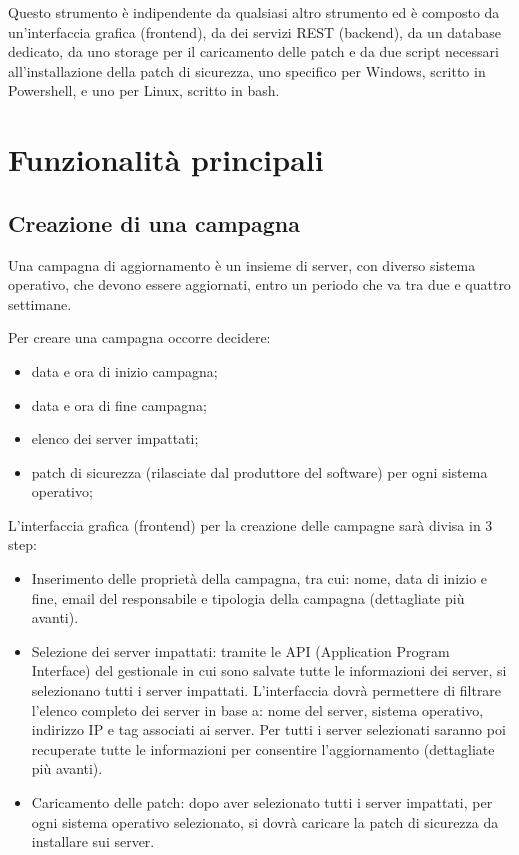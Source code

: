 Questo strumento è indipendente da qualsiasi altro strumento ed è composto
da un’interfaccia grafica (frontend), da dei servizi REST (backend), da
un database dedicato, da uno storage per il caricamento delle patch e da
due script necessari all’installazione della patch di sicurezza, uno 
specifico per Windows, scritto in Powershell, e uno per Linux, scritto 
in bash.


\section{Funzionalità principali}
\subsection{Creazione di una campagna}
Una campagna di aggiornamento è un insieme di server, con diverso sistema 
operativo, che devono essere aggiornati, entro un periodo che va tra due e 
quattro settimane. 

Per creare una campagna occorre decidere:
\begin{itemize}
\item data e ora di inizio campagna;
\item data e ora di fine campagna;
\item elenco dei server impattati;
\item patch di sicurezza (rilasciate dal produttore del software) per 
ogni sistema operativo;
\end{itemize}
L’interfaccia grafica (frontend) per la creazione delle campagne sarà 
divisa in 3 step:
\begin{itemize}
\item Inserimento delle proprietà della campagna, tra cui: nome, data di 
inizio e fine, email del responsabile e tipologia della campagna 
(dettagliate più avanti).
\item Selezione dei server impattati: tramite le API (Application Program 
Interface) del gestionale in cui sono salvate tutte le informazioni dei 
server, si selezionano tutti i server impattati. L’interfaccia dovrà 
permettere di filtrare l’elenco completo dei server in base a: nome del
server, sistema operativo, indirizzo IP e tag associati ai server. 
Per tutti i server selezionati saranno poi recuperate tutte le informazioni
per consentire l’aggiornamento (dettagliate più avanti).
\item Caricamento delle patch: dopo aver selezionato tutti i server impattati,
per ogni sistema operativo selezionato, si dovrà caricare la patch di sicurezza 
da installare sui server.
\end{itemize}

